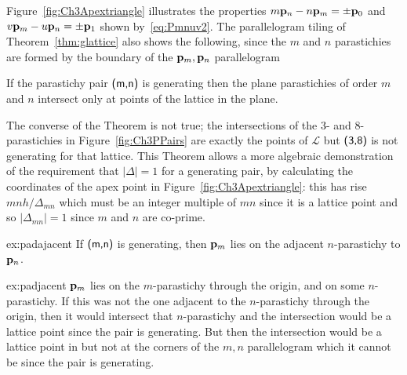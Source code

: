  Figure~\ref{fig:Ch3Apextriangle} illustrates the properties $m{\mathbf p}_{n}-n{\mathbf p}_{m}=\pm{\mathbf p}_{0}$ and $v{\mathbf p}_{m}-u{\mathbf p}_{n}=\pm{\mathbf p}_{1}$ shown by~\eqref{eq:Pmnuv2}.
%
%
%
The parallelogram tiling of Theorem~\ref{thm:glattice} also shows the following, since the $m$ and $n$ parastichies are formed by the boundary of the ${\mathbf p}_{m},{\mathbf p}_{n}$ parallelogram
\begin{theorem}
	\label{thm:planeintersect}
	If the parastichy pair $\textsf{(m,n)}$ is generating then the plane parastichies of order $m$ and $n$ intersect only at points of the lattice in the plane.
\end{theorem}
The converse of the Theorem is not true; the intersections of the 3- and 8-parastichies in  Figure~\ref{fig:Ch3PPairs} are exactly the points of $\mathcal{L}$ but $\textsf{(3,8)}$ is not generating for that lattice. 
This Theorem allows a more algebraic demonstration of the requirement that $|\Delta|=1$ for a generating pair,  by calculating the coordinates of the apex point in Figure~\ref{fig:Ch3Apextriangle}: this has rise $mnh/\Delta_{mn}$ which must be an integer multiple of $mn$ since it is a lattice point and so $|\Delta_{mn}|=1$ since $m$ and $n$ are co-prime.  

	
\begin{jExercise}{ex:padajacent}
	If $\textsf{(m,n)}$ is generating, then ${\mathbf p}_{m}$ lies on the adjacent $n$-parastichy to ${\mathbf p}_{n}$. 
\end{jExercise}

\begin{jAnswer}{ex:padjacent}
	${\mathbf p}_{m}$ lies on the $m$-parastichy through the origin, and on some $n$-parastichy. If this was not the one adjacent to the $n$-parastichy through the origin, then it would intersect that $n$-parastichy and the intersection would be a lattice point since the pair is generating. But then the intersection would be a lattice point in but not at the corners of the $m,n$ parallelogram which it cannot be since the pair is generating. 
\end{jAnswer}

